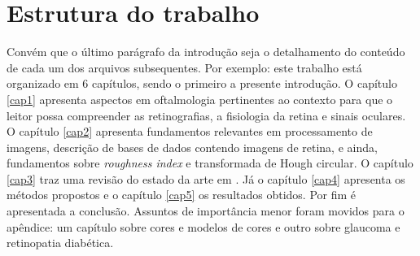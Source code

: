 \section{Estrutura do trabalho}

Convém que o último parágrafo da introdução seja o detalhamento do conteúdo de cada um dos arquivos subsequentes. Por exemplo: este trabalho está organizado em 6 capítulos, sendo o primeiro a presente introdução. O capítulo \ref{cap1} apresenta aspectos em oftalmologia pertinentes ao contexto para que o leitor possa compreender as retinografias, a fisiologia da retina e sinais oculares. O capítulo \ref{cap2} apresenta fundamentos relevantes em processamento de imagens, descrição de bases de dados contendo imagens de retina, e ainda, fundamentos sobre \textit{roughness index} e transformada de Hough circular. O capítulo \ref{cap3} traz  uma revisão do estado da arte em \tema. Já o capítulo \ref{cap4} apresenta os métodos propostos e o capítulo \ref{cap5} os resultados obtidos. Por fim é apresentada a conclusão. Assuntos de importância menor foram movidos para o apêndice: um capítulo sobre cores e modelos de cores e outro sobre glaucoma e retinopatia diabética.
